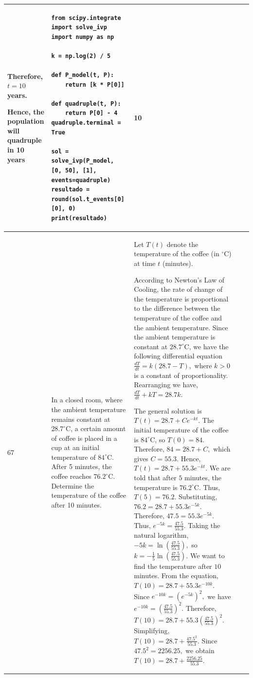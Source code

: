 \documentclass[a4paper,12pt]{article}
\begin{document}
\begin{longtable}{|p{0.3cm}|p{}|p{10cm}|p{}|p{1.5cm}|}
Therefore, $t=10$ years.

Hence, the population will quadruple in 10 years



 &\begin{verbatim}
from scipy.integrate import solve_ivp
import numpy as np

k = np.log(2) / 5

def P_model(t, P):
    return [k * P[0]]

def quadruple(t, P):
    return P[0] - 4
quadruple.terminal = True

sol = solve_ivp(P_model, [0, 50], [1], events=quadruple)
resultado = round(sol.t_events[0][0], 0)
print(resultado)
\end{verbatim}& 10 \\ \hline 
 67           & In a closed room, where the ambient temperature remains constant at 
$28.7^\circ\mathrm{C}$, a certain amount of coffee is placed in a cup 
at an initial temperature of $84^\circ\mathrm{C}$. After 5 minutes, the coffee reaches $76.2^\circ\mathrm{C}$. Determine the temperature of the coffee after 10 minutes.


              &Let $T(t)$ denote the temperature of the coffee (in ${}^\circ\mathrm{C}$) at time $t$ (minutes).

According to Newton's Law of Cooling, the rate of change of the temperature is proportional to the difference between the temperature of the coffee and the ambient temperature. Since the ambient temperature is constant at $28.7^\circ\mathrm{C}$, we have the following differential equation
$\frac{dT}{dt}=k(28.7-T),$ where $k>0$ is a constant of proportionality. Rearranging we have, 
$\frac{dT}{dt}+kT=28.7k.$

The general solution is $T(t)=28.7+Ce^{-kt}.$
The initial temperature of the coffee is $84^\circ\mathrm{C}$, so
$T(0)=84.$ Therefore, $84=28.7+C,$
which gives $C=55.3.$
Hence, $T(t)=28.7+55.3e^{-kt}.$
We are told that after $5$ minutes, the temperature is $76.2^\circ\mathrm{C}$. Thus, $T(5)=76.2.$ Substituting,
$76.2=28.7+55.3e^{-5k}.$
Therefore, $47.5=55.3e^{-5k}.$
Thus, $e^{-5k}=\frac{47.5}{55.3}.$
Taking the natural logarithm,
$-5k=\ln\left(\frac{47.5}{55.3}\right),$ so $k=-\frac{1}{5}\ln\left(\frac{47.5}{55.3}\right).$ We want to find the temperature after $10$ minutes. From the equation, $T(10)=28.7+55.3e^{-10k}.$ 
Since $e^{-10k}=\left(e^{-5k}\right)^2,$
we have $e^{-10k}=\left(\frac{47.5}{55.3}\right)^2.$
Therefore, $T(10)=28.7+55.3\left(\frac{47.5}{55.3}\right)^2.$
Simplifying, $T(10)=28.7+\frac{47.5^2}{55.3}.$
Since $47.5^2=2256.25,$ we obtain
$T(10)=28.7+\frac{2256.25}{55.3}.$


\end{longtable}
\end{document}

